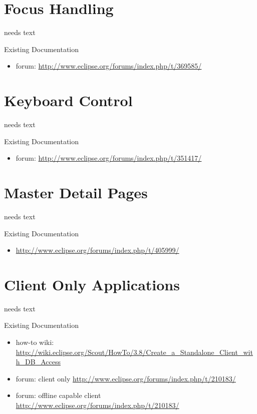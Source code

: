 \documentclass[a4paper,10pt,twoside]{book}
\begin{document}
\section{Focus Handling}
needs text

\noindent Existing Documentation
\begin{itemize}
  \item forum: \url{http://www.eclipse.org/forums/index.php/t/369585/}
\end{itemize}

\section{Keyboard Control}
needs text

\noindent Existing Documentation
\begin{itemize}
  \item forum: \url{http://www.eclipse.org/forums/index.php/t/351417/}
\end{itemize}

\section{Master Detail Pages}
needs text

\noindent Existing Documentation
\begin{itemize}
  \item \url{http://www.eclipse.org/forums/index.php/t/405999/}
\end{itemize}

\section{Client Only Applications}
needs text

\noindent Existing Documentation
\begin{itemize}
  \item how-to wiki: \url{http://wiki.eclipse.org/Scout/HowTo/3.8/Create_a_Standalone_Client_with_DB_Access}
  \item forum: client only \url{http://www.eclipse.org/forums/index.php/t/210183/}
  \item forum: offline capable client \url{http://www.eclipse.org/forums/index.php/t/210183/}
\end{itemize}
\end{document}
